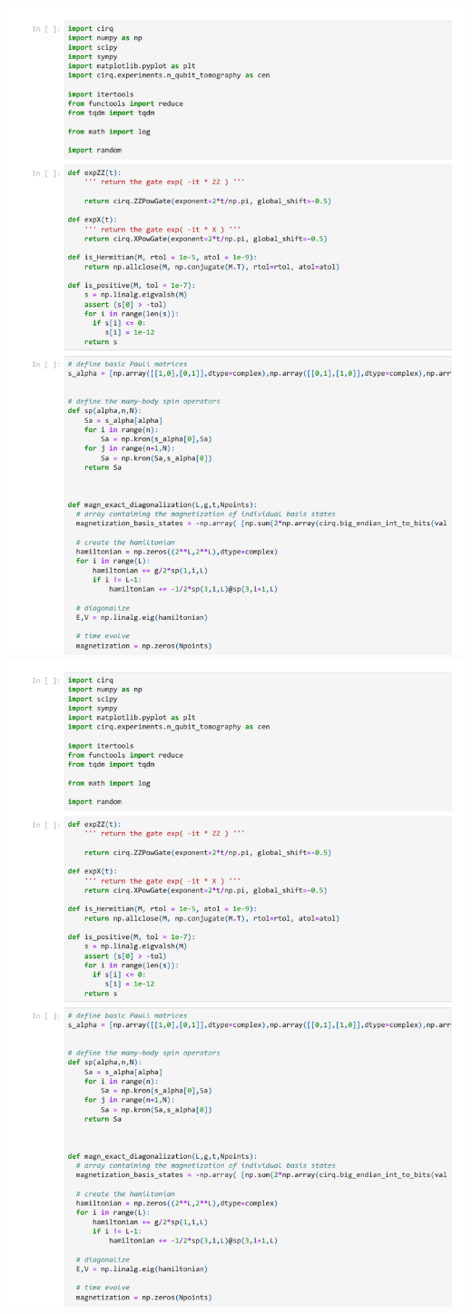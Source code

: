 \includegraphics[page=12, width=\textwidth]{tex/Day2.pdf}
\includegraphics[page=13, width=\textwidth]{tex/Day2.pdf}